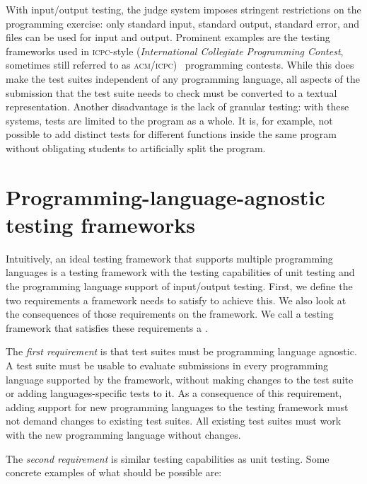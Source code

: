 \documentclass[../main]{subfiles}
\begin{document}
With input/output testing, the judge system imposes stringent restrictions on the programming exercise: only standard input, standard output, standard error, and files can be used for input and output.
Prominent examples are the testing frameworks used in \textsc{icpc}-style (\emph{International Collegiate Programming Contest}, sometimes still referred to as \textsc{acm/icpc})~\autocite{ICPCFactSheet2020} programming contests.
While this does make the test suites independent of any programming language, all aspects of the submission that the test suite needs to check must be converted to a textual representation.
Another disadvantage is the lack of granular testing: with these systems, tests are limited to the program as a whole.
It is, for example, not possible to add distinct tests for different functions inside the same program without obligating students to artificially split the program.

\section{Programming-language-agnostic testing frameworks}\label{sec:tested1-programming-language-agnostic-test-frameworks}

Intuitively, an ideal testing framework that supports multiple programming languages is a testing framework with the testing capabilities of unit testing and the programming language support of input/output testing.
First, we define the two requirements a framework needs to satisfy to achieve this.
We also look at the consequences of those requirements on the framework.
We call a testing framework that satisfies these requirements a .

The \emph{first requirement} is that test suites must be programming language agnostic.
A test suite must be usable to evaluate submissions in every programming language supported by the framework, without making changes to the test suite or adding languages-specific tests to it.
As a consequence of this requirement, adding support for new programming languages to the testing framework must not demand changes to existing test suites.
All existing test suites must work with the new programming language without changes.

The \emph{second requirement} is similar testing capabilities as unit testing.
Some concrete examples of what should be possible are:
\end{document}
